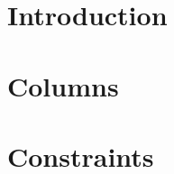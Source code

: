 

\section{Introduction}             \label{mxp: intro}                       
\section{Columns}                  \label{mxp: columns}                     
\section{Constraints}              \label{mxp: constraints}                 
